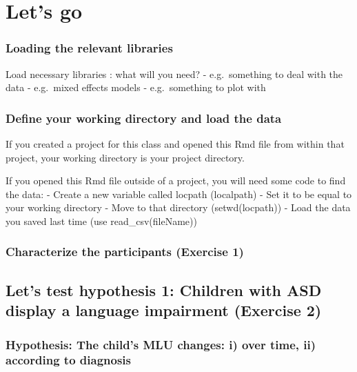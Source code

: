 \documentclass[]{article}
\begin{document}
\section{Let's go}\label{lets-go}

\subsubsection{Loading the relevant
libraries}\label{loading-the-relevant-libraries}

Load necessary libraries : what will you need? - e.g.~something to deal
with the data - e.g.~mixed effects models - e.g.~something to plot with

\subsubsection{Define your working directory and load the
data}\label{define-your-working-directory-and-load-the-data}

If you created a project for this class and opened this Rmd file from
within that project, your working directory is your project directory.

If you opened this Rmd file outside of a project, you will need some
code to find the data: - Create a new variable called locpath
(localpath) - Set it to be equal to your working directory - Move to
that directory (setwd(locpath)) - Load the data you saved last time (use
read\_csv(fileName))

\subsubsection{Characterize the participants (Exercise
1)}\label{characterize-the-participants-exercise-1}

\subsection{Let's test hypothesis 1: Children with ASD display a
language impairment (Exercise
2)}\label{lets-test-hypothesis-1-children-with-asd-display-a-language-impairment-exercise-2}

\subsubsection{Hypothesis: The child's MLU changes: i) over time, ii)
according to
diagnosis}\label{hypothesis-the-childs-mlu-changes-i-over-time-ii-according-to-diagnosis}
\end{document}
